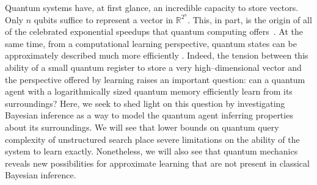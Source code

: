 \documentclass[aps,amsmath,onecolumn,amssymb,notitlepage]{revtex4-1}
\begin{document}

Quantum systems have, at first glance, an incredible capacity to store vectors.  Only $n$ qubits suffice to represent a vector in $\mathbb{R}^{2^n}$.  This, in part, is the origin of all of the celebrated exponential speedups that quantum computing offers~\cite{shor1994algorithms,lloyd1996universal,childs2003exponential,HHL09}.
At the same time, from a computational learning perspective, quantum states can be approximately described
much more efficiently \cite{aaronson_learnability_2007}. 
Indeed, the tension between this ability of a small quantum register to store a very high--dimensional vector and the perspective offered by learning raises an important question: can a quantum agent with a logarithmically sized quantum memory efficiently learn from its surroundings?
Here, we seek to shed light on this question by investigating Bayesian inference as a way to model the quantum agent inferring properties about its surroundings.  We will see that lower bounds on quantum query complexity of unstructured search place severe limitations on the ability of the system to learn exactly.  Nonetheless, we will also see that quantum mechanics reveals new possibilities for approximate learning that are not present in classical Bayesian inference.
\end{document}
